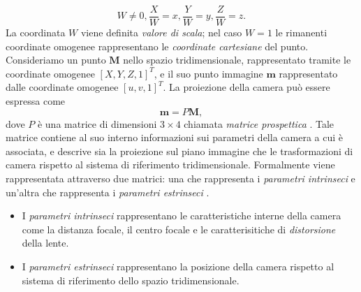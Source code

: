 \[W\neq 0,
\frac{X}{W}=x,
\frac{Y}{W}=y,
\frac{Z}{W}=z.\]
La coordinata $W$ viene definita \textit{valore di scala}; nel caso $W=1$ le rimanenti coordinate omogenee rappresentano le \textit{coordinate cartesiane} del punto.\\
Consideriamo un punto $\textbf{M}$ nello spazio tridimensionale, rappresentato tramite le coordinate omogenee $[X,Y,Z,1]^\textit{T}$, e il suo punto immagine $\textbf{m}$ rappresentato dalle coordinate omogenee $[u,v,1]^\textit{T}$.
La proiezione della camera pu\`o essere espressa come
\begin{equation}
\label{eq:proiezione}
\textbf{m}=P\textbf{M},
\end{equation}
dove $P$  \`e una matrice di dimensioni $3 \times 4$ chiamata \textit{matrice prospettica} \cite{hartley2003multiple}.
Tale matrice contiene al suo interno informazioni sui parametri della camera a cui \`e associata, e descrive sia la proiezione sul piano immagine che le trasformazioni di camera rispetto al sistema di riferimento tridimensionale.
Formalmente viene rappresentata attraverso due matrici: una che rappresenta i \textit{parametri intrinseci} e un'altra che rappresenta i \textit{parametri estrinseci} \cite{forsyth2002computer}.
\begin{itemize}
	\item I \textit{parametri intrinseci} rappresentano le caratteristiche interne della camera come la distanza focale, il centro focale e le caratterisitiche di \textit{distorsione} della lente.
	\item I \textit{parametri estrinseci} rappresentano la posizione della camera rispetto al sistema di riferimento dello spazio tridimensionale.
\end{itemize} 
